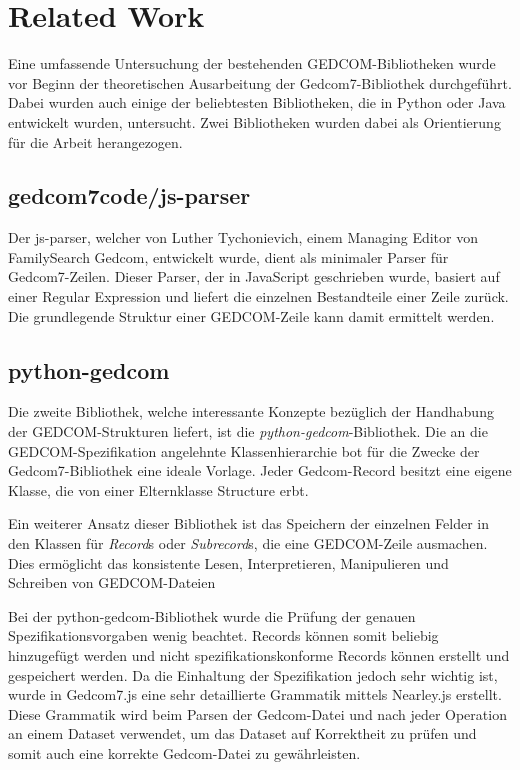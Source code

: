 \chapter{Related Work}
\label{chap: Related Work}
Eine umfassende Untersuchung der bestehenden GEDCOM-Bibliotheken wurde vor Beginn der theoretischen Ausarbeitung der Gedcom7-Bibliothek durchgeführt. 
Dabei wurden auch einige der beliebtesten Bibliotheken, die in Python oder Java entwickelt wurden, untersucht. Zwei Bibliotheken wurden dabei als Orientierung 
für die Arbeit herangezogen.

\section{gedcom7code/js-parser}

Der js-parser, welcher von Luther Tychonievich, einem Managing Editor von FamilySearch Gedcom, entwickelt wurde, dient als minimaler Parser für Gedcom7-Zeilen. 
Dieser Parser, der in JavaScript geschrieben wurde, basiert auf einer Regular Expression und liefert die einzelnen Bestandteile einer Zeile zurück. Die grundlegende 
Struktur einer GEDCOM-Zeile kann damit ermittelt werden.

\section{python-gedcom}

Die zweite Bibliothek, welche interessante Konzepte bezüglich der Handhabung der GEDCOM-Strukturen liefert, ist die \textit{python-gedcom}-Bibliothek. 
Die an die GEDCOM-Spezifikation angelehnte Klassenhierarchie bot für die Zwecke der Gedcom7-Bibliothek eine ideale Vorlage. Jeder Gedcom-Record besitzt eine eigene Klasse, 
die von einer Elternklasse Structure erbt.

Ein weiterer Ansatz dieser Bibliothek ist das Speichern der einzelnen Felder in den Klassen für \textit{Record}s oder \textit{Subrecord}s, die eine GEDCOM-Zeile ausmachen. 
Dies ermöglicht das konsistente Lesen, Interpretieren, Manipulieren und Schreiben von GEDCOM-Dateien

Bei der python-gedcom-Bibliothek wurde die Prüfung der genauen Spezifikationsvorgaben wenig beachtet. Records können somit beliebig
hinzugefügt werden und nicht spezifikationskonforme Records können erstellt und gespeichert werden.
\newpage
Da die Einhaltung der Spezifikation jedoch sehr wichtig ist, wurde in Gedcom7.js eine sehr detaillierte Grammatik mittels Nearley.js erstellt. Diese Grammatik wird
beim Parsen der Gedcom-Datei und nach jeder Operation an einem Dataset verwendet, um das Dataset auf Korrektheit zu prüfen und somit auch eine korrekte Gedcom-Datei
zu gewährleisten.